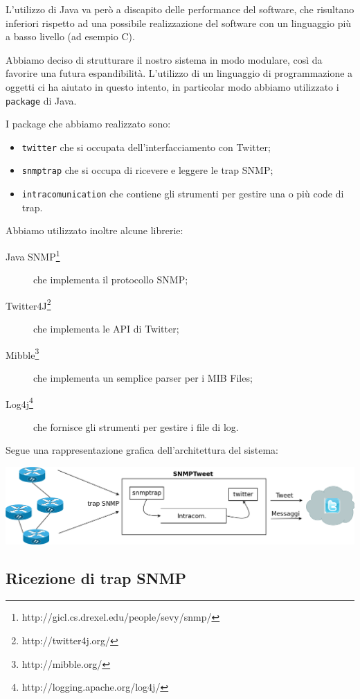 \documentclass[a4paper, 10pt]{article}
\begin{document}
L'utilizzo di Java va  per\`o a discapito delle performance del software, che risultano inferiori rispetto ad una possibile realizzazione del software con un linguaggio pi\`u a basso livello (ad esempio C).

Abbiamo deciso di strutturare il nostro sistema in modo modulare, cos\`i da favorire una futura espandibilit\`a. L'utilizzo di un linguaggio di programmazione a oggetti ci ha aiutato in questo intento, in particolar modo abbiamo utilizzato i \texttt{package} di Java.

I package che abbiamo realizzato sono:
\begin{itemize}
	\item \texttt{twitter} che si occupata dell'interfacciamento con Twitter;
	\item \texttt{snmptrap} che si occupa di ricevere e leggere le trap SNMP;
	\item \texttt{intracomunication} che contiene gli strumenti per gestire una o pi\`u code di trap.
\end{itemize}

Abbiamo utilizzato inoltre alcune librerie:
\begin{description}
	\item[Java SNMP\footnote{http://gicl.cs.drexel.edu/people/sevy/snmp/}] che implementa il protocollo SNMP;
	\item[Twitter4J\footnote{http://twitter4j.org/}] che implementa le API di Twitter;
	\item[Mibble\footnote{http://mibble.org/}] che implementa un semplice parser per i MIB Files;
	\item[Log4j\footnote{http://logging.apache.org/log4j/}] che fornisce gli strumenti per gestire i file di log.
\end{description}

Segue una rappresentazione grafica dell'architettura del sistema:

\includegraphics[scale=0.20]{diagram.png}

\subsection{Ricezione di trap SNMP}
\end{document}
